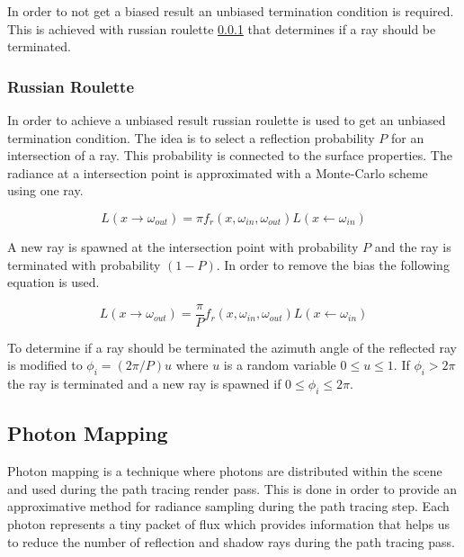 \documentclass[a4paper, twocolumn]{article}
\begin{document}
          In order to not get a biased result an unbiased termination condition is required. This is achieved with russian roulette \ref{sec:russian_roulette} that determines if a ray should be terminated.

          \subsubsection{Russian Roulette} \label{sec:russian_roulette}
          In order to achieve a unbiased result russian roulette is used to get an unbiased termination condition. The idea is to select a reflection probability $P$ for an intersection of a ray. This probability is connected to the surface properties. The radiance at a intersection point is approximated with a Monte-Carlo scheme using one ray.

          \begin{equation*}
            L(x \rightarrow \omega_{out}) = \pi f_r(x, \omega_{in}, \omega_{out}) L(x \leftarrow \omega_{in})
          \end{equation*}

          A new ray is spawned at the intersection point with probability $P$ and the ray is terminated with probability $(1-P)$. In order to remove the bias the following equation is used.

          \begin{equation*}
            L(x \rightarrow \omega_{out}) = \frac{\pi}{P} f_r(x, \omega_{in}, \omega_{out}) L(x \leftarrow \omega_{in})
          \end{equation*}

          To determine if a ray should be terminated the azimuth angle of the reflected ray is modified to $\phi_i = (2\pi/P)u$ where $u$ is a random variable $0 \leq u \leq 1$. If $\phi_i > 2\pi$ the ray is terminated and a new ray is spawned if $0 \leq \phi_i \leq 2\pi$.

        \subsection{Photon Mapping} \label{sec:photon_mapping}

        Photon mapping is a technique where photons are distributed within the scene and used during the path tracing render pass. This is done in order to provide an approximative method for radiance sampling during the path tracing step. Each photon represents a tiny packet of flux which provides information that helps us to reduce the number of reflection and shadow rays during the path tracing pass. 
\end{document}
